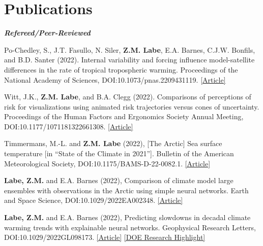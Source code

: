 \documentclass[margin,line,palatino,courier,10pt]{res}
\begin{document}
\begin{resume}
\vspace{-0.1in}
\noindent\textcolor{Cerulean}{\makebox[\linewidth][r]{\rule{\textwidth}{5pt}}}
\vspace{-0.3in}

\section{\sc \large{\textcolor{Cerulean}{\textbf{Publications}}}} 
\textit{\textbf{Refereed/Peer-Reviewed}}
\vspace*{-0.1in}\\
\begin{etaremune}[leftmargin=0in,topsep=0in,parsep=0in]
\item Po-Chedley, S., J.T. Fasullo, N. Siler, \textbf{Z.M. Labe}, E.A. Barnes, C.J.W. Bonfils, and B.D. Santer (2022). Internal variability and forcing influence model-satellite differences in the rate of tropical tropospheric warming. Proceedings of the National Academy of Sciences, DOI:10.1073/pnas.2209431119. \href{https://www.pnas.org/doi/10.1073/pnas.2209431119}{[Article]}
\item Witt, J.K., \textbf{Z.M. Labe}, and B.A. Clegg (2022). Comparisons of perceptions of risk for visualizations using animated risk trajectories versus cones of uncertainty. Proceedings of the Human Factors and Ergonomics Society Annual Meeting, DOI:10.1177/1071181322661308. \href{https://doi.org/10.1177/1071181322661308}{[Article]}
\item Timmermans, M.-L. and \textbf{Z.M. Labe} (2022), [The Arctic] Sea surface temperature [in ``State of the Climate in 2021'']. Bulletin of the American Meteorological Society, DOI:10.1175/BAMS-D-22-0082.1. \href{https://doi.org/10.1175/BAMS-D-22-0082.1}{[Article]}
\item \textbf{Labe, Z.M.} and E.A. Barnes (2022), Comparison of climate model large ensembles with observations in the Arctic using simple neural networks. Earth and Space Science, DOI:10.1029/2022EA002348. \href{https://doi.org/10.1029/2022EA002348}{[Article]}
\item \textbf{Labe, Z.M.} and E.A. Barnes (2022), Predicting slowdowns in decadal climate warming trends with explainable neural networks. Geophysical Research Letters, DOI:10.1029/2022GL098173. \href{https://doi.org/10.1029/2022GL098173}{[Article]} \href{https://climatemodeling.science.energy.gov/research-highlights/predicting-slowdowns-decadal-climate-warming-trends-explainable-neural-networks}{[DOE Research Highlight]}

\end{etaremune}
\end{resume}
\end{document}

